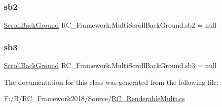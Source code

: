 \subsubsection{\texorpdfstring{sb2}{sb2}}
{\footnotesize\ttfamily \mbox{\hyperlink{class_r_c___framework_1_1_scroll_back_ground}{Scroll\+Back\+Ground}} R\+C\+\_\+\+Framework.\+Multi\+Scroll\+Back\+Ground.\+sb2 = null}

\mbox{\label{class_r_c___framework_1_1_multi_scroll_back_ground_ae010d29cb2cf4bd24b459679a37cd7a4}} 
\subsubsection{\texorpdfstring{sb3}{sb3}}
{\footnotesize\ttfamily \mbox{\hyperlink{class_r_c___framework_1_1_scroll_back_ground}{Scroll\+Back\+Ground}} R\+C\+\_\+\+Framework.\+Multi\+Scroll\+Back\+Ground.\+sb3 = null}



The documentation for this class was generated from the following file\+:\begin{DoxyCompactItemize}
\item 
F\+:/\+B/\+R\+C\+\_\+\+Framework2018/\+Source/\mbox{\hyperlink{_r_c___renderable_multi_8cs}{R\+C\+\_\+\+Renderable\+Multi.\+cs}}\end{DoxyCompactItemize}
